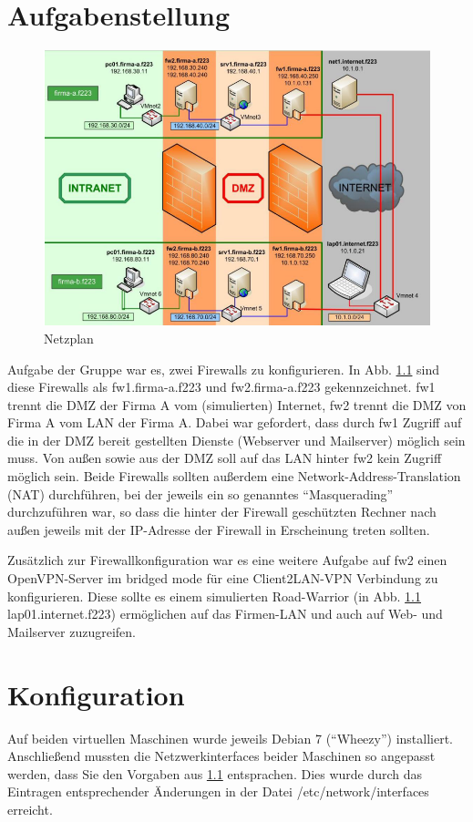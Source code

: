 \chapter{Aufgabenstellung}
\begin{figure}
	\centering
		\includegraphics[width=1.00\textwidth]{figures/netzplan.PNG}
	\caption{Netzplan \cite{Neuschwander2014}}
	\label{fig:netzplan}
\end{figure}

Aufgabe der Gruppe war es, zwei Firewalls zu konfigurieren. In Abb. \ref{fig:netzplan} sind diese Firewalls als fw1.firma-a.f223 und fw2.firma-a.f223 gekennzeichnet. fw1 trennt die DMZ der Firma A vom (simulierten) Internet, fw2 trennt die DMZ von Firma A vom LAN der Firma A. Dabei war gefordert, dass durch fw1 Zugriff auf die in der DMZ bereit gestellten Dienste (Webserver und Mailserver) möglich sein muss. Von außen sowie aus der DMZ soll auf das LAN hinter fw2 kein Zugriff möglich sein. Beide Firewalls sollten außerdem eine Network-Address-Translation (NAT) durchführen, bei der jeweils ein so genanntes "`Masquerading"' durchzuführen war, so dass die hinter der Firewall geschützten Rechner nach außen jeweils mit der IP-Adresse der Firewall in Erscheinung treten sollten.

Zusätzlich zur Firewallkonfiguration war es eine weitere Aufgabe auf fw2 einen OpenVPN-Server im bridged mode für eine Client2LAN-VPN Verbindung zu konfigurieren. Diese sollte es einem simulierten Road-Warrior (in Abb. \ref{fig:netzplan} lap01.internet.f223) ermöglichen auf das Firmen-LAN und auch auf Web- und Mailserver zuzugreifen.

\chapter{Konfiguration}
Auf beiden virtuellen Maschinen wurde jeweils Debian 7 ("`Wheezy"') installiert. Anschließend mussten die Netzwerkinterfaces beider Maschinen so angepasst werden, dass Sie den Vorgaben aus \ref{fig:netzplan} entsprachen. Dies wurde durch das Eintragen entsprechender Änderungen in der Datei /etc/network/interfaces erreicht. 

